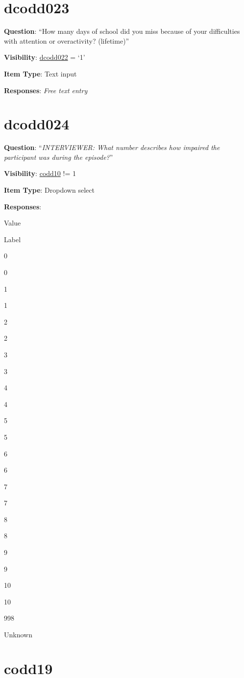 \documentclass[]{book}
\begin{document}
\hypertarget{dcodd023}{%
\section{dcodd023}\label{dcodd023}}

\textbf{Question}: ``How many days of school did you miss because of your difficulties with attention or overactivity? (lifetime)''

\textbf{Visibility}: \protect\hyperlink{dcodd022}{dcodd022} = `1'

\textbf{Item Type}: Text input

\textbf{Responses}: \emph{Free text entry}

\hypertarget{dcodd024}{%
\section{dcodd024}\label{dcodd024}}

\textbf{Question}: ``\emph{INTERVIEWER: What number describes how impaired the participant was during the episode?}''

\textbf{Visibility}: \protect\hyperlink{codd10}{codd10} != 1

\textbf{Item Type}: Dropdown select

\textbf{Responses}:

Value

Label

0

0

1

1

2

2

3

3

4

4

5

5

6

6

7

7

8

8

9

9

10

10

998

Unknown

\hypertarget{codd19}{%
\section{codd19}\label{codd19}}
\end{document}
